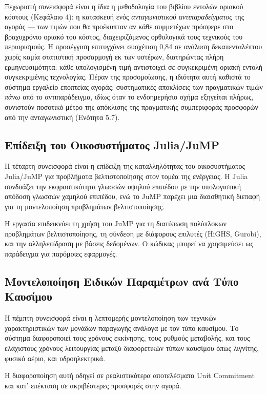 Ξεχωριστή συνεισφορά είναι η ίδια η μεθοδολογία του βιβλίου εντολών οριακού κόστους (Κεφάλαιο 4): η κατασκευή ενός \emph{ανταγωνιστικού αντιπαραδείγματος} της αγοράς --- των τιμών που θα προέκυπταν αν κάθε συμμετέχων πρόσφερε στο βραχυχρόνιο οριακό του κόστος, διαχειριζόμενος ορθολογικά τους τεχνικούς του περιορισμούς. Η προσέγγιση επιτυγχάνει συσχέτιση 0{,}84 σε ανάλυση δεκαπενταλέπτου χωρίς καμία στατιστική προσαρμογή εκ των υστέρων, διατηρώντας πλήρη ερμηνευσιμότητα: κάθε υπολογισμένη τιμή αντιστοιχεί σε συγκεκριμένη οριακή εντολή συγκεκριμένης τεχνολογίας. Πέραν της προσομοίωσης, η ιδιότητα αυτή καθιστά το σύστημα εργαλείο εποπτείας αγοράς: συστηματικές αποκλίσεις των πραγματικών τιμών \emph{πάνω} από το αντιπαράδειγμα, ιδίως όταν το ενδοημερήσιο σχήμα εξηγείται πλήρως, συνιστούν ποσοτικό μέτρο της απόκλισης της πραγματικής συμπεριφοράς προσφορών από την ανταγωνιστική (Ενότητα 5.7).

\subsection{Επίδειξη του Οικοσυστήματος Julia/JuMP}
\label{subsec:julia-contribution}

Η τέταρτη συνεισφορά είναι η επίδειξη της καταλληλότητας του οικοσυστήματος Julia/JuMP για προβλήματα βελτιστοποίησης στον τομέα της ενέργειας. Η Julia συνδυάζει την εκφραστικότητα γλωσσών υψηλού επιπέδου με την υπολογιστική απόδοση γλωσσών χαμηλού επιπέδου, ενώ το JuMP παρέχει μια διαισθητική διεπαφή για τη μοντελοποίηση προβλημάτων βελτιστοποίησης.

Η εργασία επιδεικνύει τη χρήση του JuMP για τη διατύπωση πολύπλοκων προβλημάτων βελτιστοποίησης, τη σύνδεση με διάφορους επιλυτές (HiGHS, Gurobi), και την αλληλεπίδραση με βάσεις δεδομένων. Ο κώδικας μπορεί να χρησιμεύσει ως παράδειγμα για παρόμοιες εφαρμογές.

\subsection{Μοντελοποίηση Ειδικών Παραμέτρων ανά Τύπο Καυσίμου}
\label{subsec:fuel-type-contribution}

Η πέμπτη συνεισφορά είναι η λεπτομερής μοντελοποίηση των τεχνικών χαρακτηριστικών των μονάδων παραγωγής ανάλογα με τον τύπο καυσίμου. Το σύστημα διαφοροποιεί τους χρόνους εκκίνησης, τους ρυθμούς μεταβολής, και τους ελάχιστους χρόνους λειτουργίας μεταξύ διαφορετικών τύπων καυσίμου όπως λιγνίτης, φυσικό αέριο, και υδροηλεκτρικά.

Η διαφοροποίηση αυτή οδηγεί σε ρεαλιστικότερα αποτελέσματα Unit Commitment και κατ' επέκταση σε ακριβέστερες προσφορές στην αγορά.

